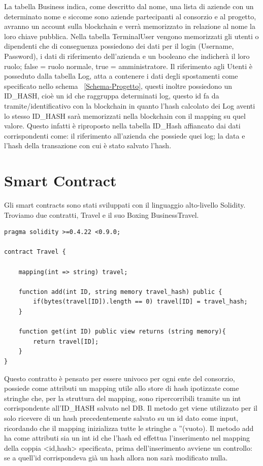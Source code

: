 \documentclass[11pt,a4paper,titlepage]{report}
\begin{document}
La tabella Business indica, come descritto dal nome, una lista di aziende con un determinato nome e siccome sono aziende partecipanti al consorzio e al progetto, avranno un account sulla blockchain e verrà memorizzato in relazione al nome la loro chiave pubblica. Nella tabella TerminalUser vengono memorizzati gli utenti o dipendenti che di conseguenza possiedono dei dati per il login (Username, Password), i dati di riferimento dell'azienda e un booleano che indicherà il loro ruolo; false = ruolo normale, true = amministratore. Il riferimento agli Utenti è posseduto dalla tabella Log, atta a contenere i dati degli spostamenti  come specificato nello schema ~\ref{Schema-Progetto}, questi inoltre possiedono un ID\_HASH, cioè un id che raggruppa determinati log, questo id fa da tramite/identificativo con la blockchain in quanto l'hash calcolato dei Log aventi lo stesso ID\_HASH sarà memorizzati nella blockchain con il mapping su quel valore. Questo infatti è riproposto nella tabella ID\_Hash affiancato dai dati corrispondenti come: il riferimento all'azienda che possiede quei log; la data e l'hash della transazione con cui è stato salvato l'hash.

\section{Smart Contract}
Gli smart contracts sono stati sviluppati con il linguaggio alto-livello Solidity. Troviamo due contratti, Travel e il suo Boxing BusinessTravel.
\begin{lstlisting}[language=Solidity]
pragma solidity >=0.4.22 <0.9.0;

contract Travel {

    mapping(int => string) travel;

    function add(int ID, string memory travel_hash) public {
        if(bytes(travel[ID]).length == 0) travel[ID] = travel_hash;
    }

    function get(int ID) public view returns (string memory){
        return travel[ID];
    }
}
\end{lstlisting}
Questo contratto è pensato per essere univoco per ogni ente del consorzio, possiede come attributi un mapping utile allo store di hash ipotizzate come stringhe che, per la struttura del mapping, sono ripercorribili tramite un int corrispondente all'ID\_HASH salvato nel DB. Il metodo get viene utilizzato per il solo ricevere di un hash precedentemente salvato su un id dato come input, ricordando che il mapping inizializza tutte le stringhe a ''(vuoto). Il metodo add ha come attributi sia un int id che l'hash ed effettua l'inserimento nel mapping della coppia <id,hash> specificata, prima dell'inserimento avviene un controllo: se a quell'id corrispondeva già un hash allora non sarà modificato nulla. 
\end{document}
